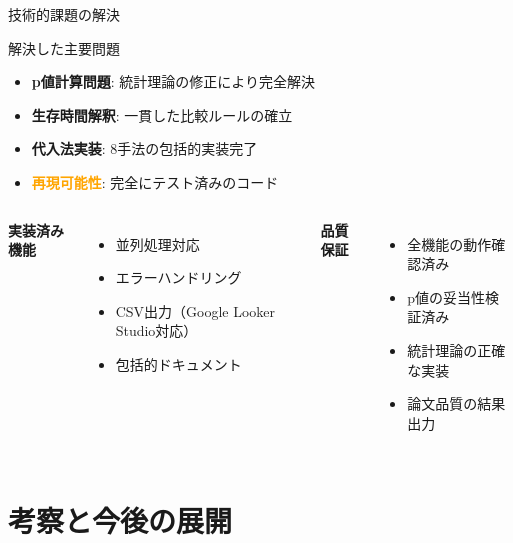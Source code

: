 \documentclass[11pt,aspectratio=169]{beamer}
\begin{document}
\begin{frame}{技術的課題の解決}
\begin{block}{解決した主要問題}
\begin{itemize}
\item \textcolor{accent}{\textbf{p値計算問題}}: 統計理論の修正により完全解決
\item \textcolor{primary}{\textbf{生存時間解釈}}: 一貫した比較ルールの確立
\item \textcolor{secondary}{\textbf{代入法実装}}: 8手法の包括的実装完了
\item \textcolor{orange}{\textbf{再現可能性}}: 完全にテスト済みのコード
\end{itemize}
\end{block}

\vspace{1em}

\begin{columns}
\textbf{実装済み機能}
\begin{itemize}
\item 並列処理対応
\item エラーハンドリング
\item CSV出力（Google Looker Studio対応）
\item 包括的ドキュメント
\end{itemize}

\textbf{品質保証}
\begin{itemize}
\item 全機能の動作確認済み
\item p値の妥当性検証済み
\item 統計理論の正確な実装
\item 論文品質の結果出力
\end{itemize}
\end{columns}
\end{frame}

\section{考察と今後の展開}
\end{document}
